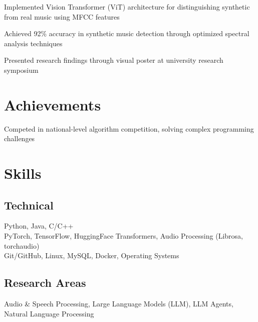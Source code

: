 \documentclass[]{deedy-resume-reversed}
\begin{document}
\begin{tightemize}
\item Implemented Vision Transformer (ViT) architecture for distinguishing synthetic from real music using MFCC features
\item Achieved 92\% accuracy in synthetic music detection through optimized spectral analysis techniques
\item Presented research findings through visual poster at university research symposium
\end{tightemize}


\section{Achievements}
Competed in national-level algorithm competition, solving complex programming challenges
\sectionsep

\sectionsep


\section{Skills}

\subsection{Technical}
 Python, Java, C/C++ \\
 PyTorch, TensorFlow, HuggingFace Transformers, Audio Processing (Librosa, torchaudio) \\
 Git/GitHub, Linux, MySQL, Docker, Operating Systems \\

\subsection{Research Areas}
Audio \& Speech Processing, Large Language Models (LLM), LLM Agents, Natural Language Processing
\sectionsep
\end{document}
